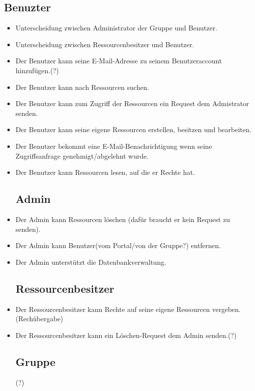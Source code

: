 \documentclass[parskip=full,11pt]{scrartcl}
\begin{document}
\subsection*{Benuzter}
\begin{itemize}[itemsep=0pt]
\item Unterscheidung zwischen \gls{Administrator} der Gruppe und Benutzer.
\item Unterscheidung zwischen \gls{Ressourcenbesitzer} und Benutzer.
 
\item Der Benutzer kann seine E-Mail-Adresse zu seinem Benutzeraccount hinzufügen.(?)
\item Der Benutzer kann nach Ressourcen suchen.
\item Der Benutzer kann zum Zugriff der Ressourcen ein Request dem Admistrator senden.
\item Der Benutzer kann seine eigene Ressourcen erstellen, besitzen und bearbeiten.
\item Der Benutzer bekommt eine E-Mail-Benachrichtigung wenn seine Zugriffsanfrage genehmigt/abgelehnt wurde.
\item Der Benutzer kann Ressourcen lesen, auf die er Rechte hat.
 
 \subsection*{Admin}
 \item Der Admin kann Ressourcen löschen (dafür braucht er kein Request zu senden).
 \item Der Admin kann Benutzer(vom Portal/von der Gruppe?) entfernen.
 \item Der Admin unterstützt die Datenbankverwaltung.
 
 
 \subsection*{Ressourcenbesitzer}
 \item Der Ressourcenbesitzer kann Rechte auf seine eigene Ressourcen vergeben.(Rechübergabe)
 \item Der Ressourcenbesitzer kann ein \gls{Löschen-Request} dem Admin senden.(?)
 
 \subsection*{Gruppe}(?)
\end{itemize}
\end{document}
